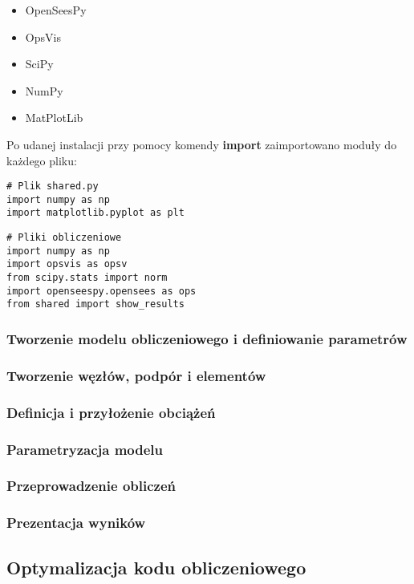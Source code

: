 \begin{itemize}
    \item OpenSeesPy
    \item OpsVis
    \item SciPy
    \item NumPy
    \item MatPlotLib
\end{itemize}

Po udanej instalacji przy pomocy komendy \textbf{import} zaimportowano moduły do każdego pliku:

\begin{lstlisting}
# Plik shared.py
import numpy as np
import matplotlib.pyplot as plt
\end{lstlisting}

\begin{lstlisting}
# Pliki obliczeniowe
import numpy as np
import opsvis as opsv
from scipy.stats import norm
import openseespy.opensees as ops
from shared import show_results
\end{lstlisting}

\subsubsection{Tworzenie modelu obliczeniowego i definiowanie parametrów}
\subsubsection{Tworzenie węzłów, podpór i elementów}
\subsubsection{Definicja i przyłożenie obciążeń}
\subsubsection{Parametryzacja modelu}
\subsubsection{Przeprowadzenie obliczeń}
\subsubsection{Prezentacja wyników}

\subsection{Optymalizacja kodu obliczeniowego}
